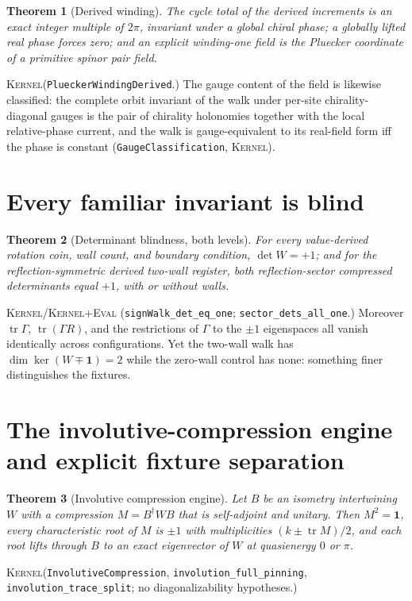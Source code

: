 \documentclass[11pt]{article}
\newcommand{\id}{\mathbf{1}}
\newcommand{\tr}{\operatorname{tr}}
\newcommand{\Kernel}{\textcolor{kernelcolor}{\textsc{Kernel}}}
\newcommand{\DraftTrust}{\textcolor{draftcolor}{\textsc{Kernel+Eval}}}
\newtheorem{theorem}{Theorem}
\begin{document}
\begin{theorem}[Derived winding]\label{thm:winding}
The cycle total of the derived increments is an exact integer multiple of
$2\pi$, invariant under a global chiral phase; a globally lifted real phase
forces zero; and an explicit winding-one field is the Pluecker coordinate
of a primitive spinor pair field.
\end{theorem}
\noindent\Kernel{}\quad(\texttt{PlueckerWindingDerived}.)  The gauge
content of the field is likewise classified: the complete orbit invariant
of the walk under per-site chirality-diagonal gauges is the pair of
chirality holonomies together with the local relative-phase current, and
the walk is gauge-equivalent to its real-field form iff the phase is
constant \cite{CompanionDerivation} (\texttt{GaugeClassification},
\Kernel{}).

\section{Every familiar invariant is blind}

\begin{theorem}[Determinant blindness, both levels]\label{thm:blind}
For every value-derived rotation coin, wall count, and boundary condition,
$\det W=+1$; and for the reflection-symmetric derived two-wall register,
both reflection-sector compressed determinants equal $+1$, with or without
walls.
\end{theorem}
\noindent\Kernel{}/\DraftTrust{}\quad
(\texttt{signWalk\_det\_eq\_one}; \texttt{sector\_dets\_all\_one}.)
Moreover $\tr\Gamma$, $\tr(\Gamma R)$, and the restrictions of $\Gamma$ to
the $\pm1$ eigenspaces all vanish identically across configurations.  Yet
the two-wall walk has $\dim\ker(W\mp\id)=2$ while the zero-wall control has
none: something finer distinguishes the fixtures.

\section{The involutive-compression engine and explicit fixture separation}

\begin{theorem}[Involutive compression engine]\label{thm:engine}
Let $B$ be an isometry intertwining $W$ with a compression $M=B^\dagger WB$
that is self-adjoint and unitary.  Then $M^2=\id$, every characteristic
root of $M$ is $\pm1$ with multiplicities $(k\pm\tr M)/2$, and each root
lifts through $B$ to an exact eigenvector of $W$ at quasienergy $0$ or
$\pi$.
\end{theorem}
\noindent\Kernel{}\quad(\texttt{InvolutiveCompression},
\texttt{involution\_full\_pinning}, \texttt{involution\_trace\_split};
no diagonalizability hypotheses.)
\end{document}
